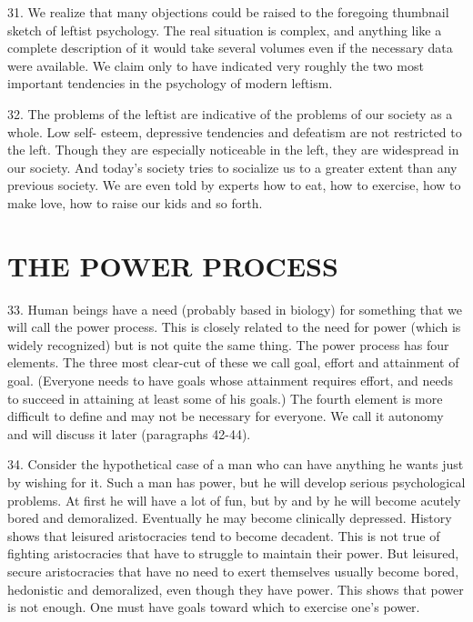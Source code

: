 \documentclass{article}
\begin{document}
31. We realize that many objections could be raised to the foregoing thumbnail sketch of leftist 
psychology. The real situation is complex, and anything like a complete description of it would 
take several volumes even if the necessary data were available. We claim only to have indicated 
very roughly the two most important tendencies in the psychology of modern leftism. \vspace{\baselineskip}

32. The problems of the leftist are indicative of the problems of our society as a whole. Low self-
esteem, depressive tendencies and defeatism are not restricted to the left. Though they are 
especially noticeable in the left, they are widespread in our society. And today’s society tries to 
socialize us to a greater extent than any previous society. We are even told by experts how to eat, 
how to exercise, how to make love, how to raise our kids and so forth. 


\section{THE POWER PROCESS}

\hspace{0.5cm} 33. Human beings have a need (probably based in biology) for something that we will call 
the power process. This is closely related to the need for power (which is widely recognized) but 
is not quite the same thing. The power process has four elements. The three most clear-cut of 
these we call goal, effort and attainment of goal. (Everyone needs to have goals whose attainment 
requires effort, and needs to succeed in attaining at least some of his goals.) The fourth element is 
more difficult to define and may not be necessary for everyone. We call it autonomy and will 
discuss it later (paragraphs 42-44). \vspace{\baselineskip}

34. Consider the hypothetical case of a man who can have anything he wants just by wishing for 
it. Such a man has power, but he will develop serious psychological problems. At first he will 
have a lot of fun, but by and by he will become acutely bored and demoralized. Eventually he may 
become clinically depressed. History shows that leisured aristocracies tend to become 
decadent. This is not true of fighting aristocracies that have to struggle to maintain their 
power. But leisured, secure aristocracies that have no need to exert themselves usually become 
bored, hedonistic and demoralized, even though they have power. This shows that power is not 
enough. One must have goals toward which to exercise one’s power. \vspace{\baselineskip}
\end{document}
